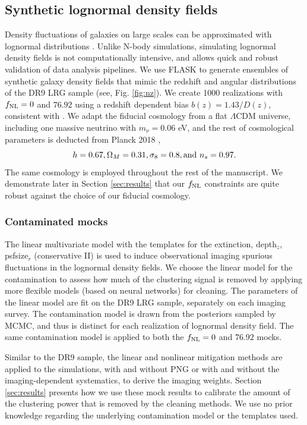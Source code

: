 \subsection{Synthetic lognormal density fields}\label{ssec:mocks}
Density fluctuations of galaxies on large scales can be approximated with lognormal distributions \citep{coles1991}. Unlike N-body simulations, simulating lognormal density fields is not computationally intensive, and allows quick and robust validation of data analysis pipelines. We use \textsc{FLASK} \citep[Full-sky Lognormal Astro-fields Simulation Kit;][]{Xavier_2016} to generate ensembles of synthetic galaxy density fields that mimic the redshift and angular distributions of the DR9 LRG sample (see, Fig. \ref{fig:nz}). We create 1000 realizations with $f_{\rm NL}=0$ and $76.92$ using a redshift dependent bias $b(z)=1.43/D(z)$, consistent with \cite{zhou2021clustering}. We adapt the fiducial cosmology from a flat $\Lambda$CDM universe, including one massive neutrino with $m_{\nu}=0.06$ eV, and the rest of cosmological parameters is deducted from Planck 2018 \citep{aghanim2020planck},
\begin{equation*}
 h = 0.67, \Omega_{M}=0.31, \sigma_{8}=0.8, {\rm and}~ n_{s}=0.97.
\end{equation*}
The same cosmology is employed throughout the rest of the manuscript. We demonstrate later in Section \ref{sec:results} that our $f_{\rm NL}$ constraints are quite robust against the choice of our fiducial cosmology.

\subsubsection{Contaminated mocks}
The linear multivariate model with the templates for the extinction, depth$_{z}$, psfsize$_{r}$ (conservative II) is used to induce observational imaging spurious fluctuations in the lognormal density fields. We choose the linear model for the contamination to assess how much of the clustering signal is removed by applying more flexible models (based on neural networks) for cleaning. The parameters of the linear model are fit on the DR9 LRG sample, separately on each imaging survey. The contamination model is drawn from the posteriors sampled by MCMC, and thus is distinct for each realization of lognormal density field. The same contamination model is applied to both the $f_{\rm NL}=0$ and $76.92$ mocks.

Similar to the DR9 sample, the linear and nonlinear mitigation methods are applied to the simulations, with and without PNG or with and without the imaging-dependent systematics, to derive the imaging weights. Section \ref{sec:results} presents how we use these mock results to calibrate the amount of the clustering power that is removed by the cleaning methods. We use no prior knowledge regarding the underlying contamination model or the templates used. 